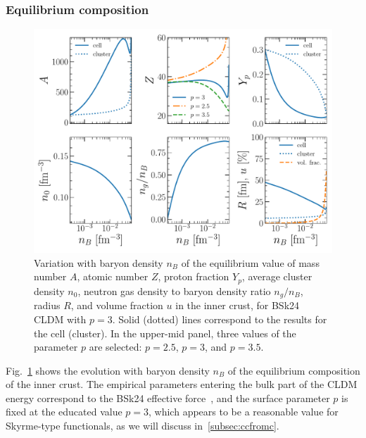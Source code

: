 \subsubsection{Equilibrium composition}

\begin{figure}[!t]
\begin{center}
  \includegraphics[width=0.9\linewidth]{figures/compo_icrust_bsk24.pdf}
\end{center}
\caption[Ground-state composition versus baryon density in the inner crust]{Variation 
  with baryon density $n_B$ of the equilibrium value of mass 
  number $A$, atomic number $Z$, proton fraction $Y_p$, average cluster density
$n_0$, neutron gas density to baryon density ratio $n_g/n_B$, radius $R$, and
volume fraction $u$ in
the inner crust, for BSk24 CLDM with $p=3$. Solid (dotted) lines correspond to 
the results for the cell (cluster). In the upper-mid panel, three values of the
parameter $p$ are selected: $p=2.5$, $p=3$, and $p=3.5$.}\label{fig:compo_icrust_bsk24}
\end{figure}
%
Fig.~\ref{fig:compo_icrust_bsk24} shows the evolution with baryon density $n_B$ 
of the equilibrium composition of the inner crust. The empirical parameters 
entering the bulk part of the CLDM energy correspond to the BSk24 effective 
force~\cite{Goriely2013}, and the surface parameter $p$ is fixed at the
educated value $p=3$, which appears to be a reasonable value for Skyrme-type 
functionals, as we will discuss in~\ref{subsec:ccfromc}.
 
